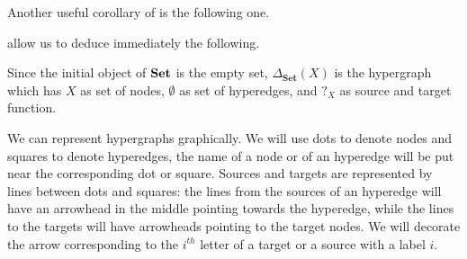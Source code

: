 \documentclass[a4paper,UKenglish,cleveref,pdftex,thm-restate,numberwithinsect]{lipics-v2021}
\newcommand{\Set}{\mathbf{Set}}
\newcommand{\catname}[1]{\textbf{\textup{#1}}}
\newcommand{\hyp}{\catname{Hyp}}
\begin{document}
Another useful corollary of  is the following one.


 allow us to deduce immediately the following.


\begin{example}Since the initial object of $\catname{Set}$ is the empty set,  $\Delta_{\Set}(X)$ is the hypergraph which has $X$ as set of nodes, $\emptyset$ as set of hyperedges, and $?_X$ as source and target function.
\end{example}


We can represent hypergraphs graphically. We will use dots to denote nodes and squares to denote hyperedges, the name of a node or of an hyperedge will be put near the corresponding dot or square. Sources and targets are represented by lines between dots and squares: the lines from the sources of an hyperedge will have an arrowhead in the middle pointing towards the hyperedge, while the lines to the targets will have arrowheads pointing to the target nodes.  We will decorate the arrow corresponding to the $i^{th}$ letter of a target or a source with a label $i$.
\end{document}
